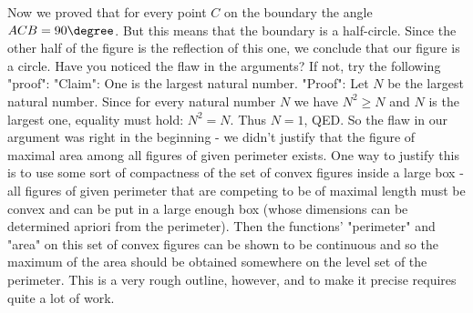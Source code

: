 Now we proved that for every point $C$ on the boundary the angle $ACB=90\degree$. But this means that the boundary is a half-circle. Since the other half of the figure is the reflection of this one, we conclude that our figure is a circle.
Have you noticed the flaw in the arguments?
If not, try the following "proof":
"Claim": One is the largest natural number.
"Proof": Let $N$ be the largest natural number. Since for every natural number $N$ we have $N^2\geq N$ and $N$ is the largest one, equality must hold: $N^2=N$. Thus $N=1$, QED.
So the flaw in our argument was right in the beginning - we didn't justify that the figure of maximal area among all figures of given perimeter exists.
One way to justify this is to use some sort of compactness of the set of convex figures inside a large box - all figures of given perimeter that are competing to be of maximal length must be convex and can be put in a large enough box (whose dimensions can be determined apriori from the perimeter). Then the functions' "perimeter" and "area" on this set of convex figures can be shown to be continuous and so the maximum of the area should be obtained somewhere on the level set of the perimeter. This is a very rough outline, however, and to make it precise requires quite a lot of work.